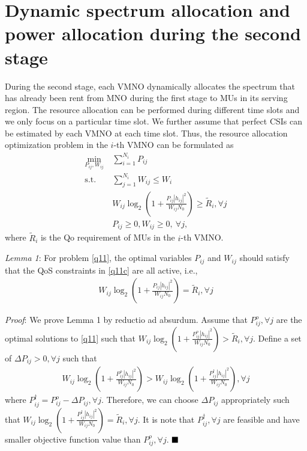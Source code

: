 \documentclass[journal]{IEEEtran}
\begin{document}
\section{Dynamic spectrum allocation and power allocation during the second stage}
During the second stage, each VMNO dynamically allocates the spectrum that has already been rent from MNO during the first stage to MUs in its serving region. The resource allocation can be performed during different time slots and we only focus on a particular time slot. We further assume that perfect CSIs can be estimated by each VMNO at each time slot. Thus, the resource allocation optimization problem in the $i$-th VMNO can be formulated as
\begin{subequations}\label{q11}
	\begin{align}
	\min_{P_{ij}, W_{ij}}\ & \sum\limits_{i = 1}^{N_i} P_{ij} \label{q11a} \\ \mbox{s.t.} \quad &  \sum\limits_{j = 1}^{N_i} W_{ij} \leq W_i \label{q11b} \\ \quad &  W_{ij}\log_2\left(1 + \frac{P_{ij}\left|h_{ij}\right|^2}{W_{ij}N_0}\right) \geq \tilde{R}_i, \forall j \label{q11c}\\
	& P_{ij} \geq 0, W_{ij} \geq 0, \ \forall j, \label{q11d}
	\end{align}
\end{subequations}
where $\tilde{R}_i$ is the Qo requirement of MUs in the $i$-th VMNO.

\textit{Lemma 1}: For problem \eqref{q11}, the optimal variables $P_{ij}$ and $W_{ij}$ should satisfy that the QoS constraints in \eqref{q11c} are all active, i.e., 
\begin{align}
W_{ij}\log_2\left(1 + \frac{P_{ij}\left|h_{ij}\right|^2}{W_{ij}N_0}\right) = \tilde{R}_i,  \forall j
\end{align}

\textit{Proof}:  
We prove Lemma 1 by reductio ad absurdum. Assume that $P_{ij}^o, \forall j$ are the optimal solutions to \eqref{q11} such that $W_{ij}\log_2\left(1 + \frac{P_{ij}^o\left|h_{ij}\right|^2}{W_{ij}N_0}\right) > \tilde{R}_i, \forall j$. Define a set of $\Delta P_{ij} > 0, \forall j$ such that 
\begin{align}
W_{ij}\log_2\left(1 + \frac{P_{ij}^o\left|h_{ij}\right|^2}{W_{ij}N_0}\right) > W_{ij}\log_2\left(1 + \frac{P_{ij}^\dag\left|h_{ij}\right|^2}{W_{ij}N_0}\right), \forall j
\end{align}
where $P_{ij}^\dag = P_{ij}^o - \Delta P_{ij}, \forall j$. Therefore, we can choose $\Delta P_{ij}$ appropriately such that $W_{ij}\log_2\left(1 + \frac{P_{ij}^\dag\left|h_{ij}\right|^2}{W_{ij}N_0}\right) = \tilde{R}_i, \forall j$. It is note that $P_{ij}^\dag, \forall j$ are feasible and have smaller objective function value than $P_{ij}^o, \forall j$.
$\hfill\blacksquare$
\end{document}
